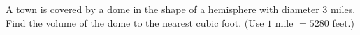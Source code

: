 A town is covered by a dome in the shape of a hemisphere with diameter $3$ miles. Find the volume of the dome to the nearest cubic foot. (Use $1$ mile $=5280$ feet.)
